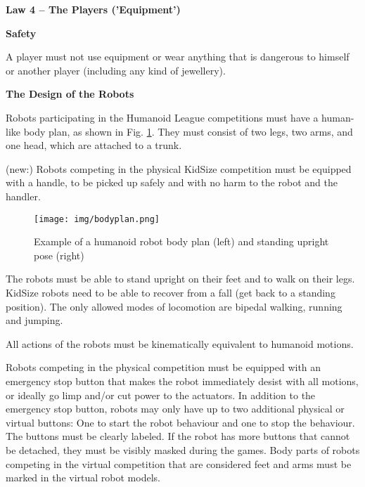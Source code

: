 \clearpage
\sffamily
{\bfseries\color[rgb]{0.4,0.4,0.4}
Law 4 -- The Players ('Equipment')}
{}

\bigskip

{\bfseries Safety }

\headlinebox

A player must not use equipment or wear anything that is dangerous to himself or another player (including any kind of jewellery).

\bigskip

{\bfseries The Design of the Robots}

\headlinebox

Robots participating in the Humanoid League competitions must have a human-like body plan, as shown in Fig. \ref{fig:bodyplan}. They must consist of two legs, two arms, and one head, which are attached to a trunk.

\bigskip

(new:) Robots competing in the physical KidSize competition must be
equipped with a handle, to be picked up safely and with no harm to the robot and
the handler.


\begin{figure}[h]
\begin{center}
\texttt{[image: img/bodyplan.png]}
\caption{Example of a humanoid robot body plan (left) and standing upright pose (right)}
\label{fig:bodyplan}
\vspace{-3ex}
\end{center}
\end{figure}


The robots must be able to stand upright on their feet and to walk on their legs.
KidSize robots need to be able to recover from a fall
(get back to a standing position).
The only allowed modes of locomotion are bipedal walking, running and jumping.

\bigskip

All actions of the robots must be kinematically equivalent to humanoid motions.

\bigskip

Robots competing in the physical competition must be equipped with an emergency stop button that makes the robot immediately desist with all motions, or ideally go limp and/or cut power to the actuators. In addition to the emergency stop button, robots may only have up to two additional physical or virtual buttons: One to start the robot behaviour and one to stop the behaviour. The buttons must be clearly labeled. If the robot has more buttons that cannot be detached, they must be visibly masked during the games.
Body parts of robots competing in the virtual competition that are considered feet and arms must be marked in the virtual robot models.

